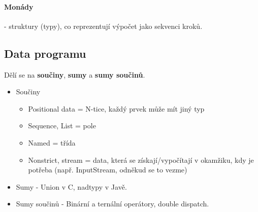 \paragraph{Monády} - struktury (typy), co reprezentují výpočet jako sekvenci kroků.

\subsection{Data programu}
Dělí se na \textbf{součiny}, \textbf{sumy} a \textbf{sumy součinů}.

\begin{itemize}[itemsep=0px]
\item Součiny
\begin{itemize}[itemsep=0px]
\item Positional data = N-tice, každý prvek může mít jiný typ
\item Sequence, List = pole
\item Named = třída
\item Nonstrict, stream = data, která se získají/vypočítají v okamžiku, kdy je potřeba (např. InputStream, odněkud se to vezme)
\end{itemize}

\item Sumy - Union v C, nadtypy v Javě.
\item Sumy součinů - Binární a ternální operátory, double dispatch.
\end{itemize}